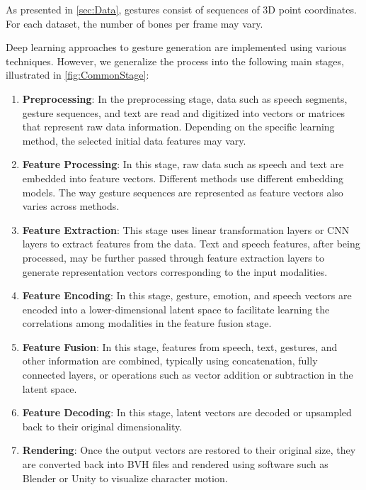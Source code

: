 As presented in \autoref{sec:Data}, gestures consist of sequences of 3D point coordinates. For each dataset, the number of bones per frame may vary.


Deep learning approaches to gesture generation are implemented using various techniques. However, we generalize the process into the following main stages, illustrated in \autoref{fig:CommonStage}:


\begin{enumerate}
	\item \textbf{Preprocessing}: In the preprocessing stage, data such as speech segments, gesture sequences, and text are read and digitized into vectors or matrices that represent raw data information. Depending on the specific learning method, the selected initial data features may vary.
	
	\item \textbf{Feature Processing}: In this stage, raw data such as speech and text are embedded into feature vectors. Different methods use different embedding models. The way gesture sequences are represented as feature vectors also varies across methods.
	
	\item \textbf{Feature Extraction}: This stage uses linear transformation layers or CNN layers to extract features from the data. Text and speech features, after being processed, may be further passed through feature extraction layers to generate representation vectors corresponding to the input modalities.
	
	\item \textbf{Feature Encoding}: In this stage, gesture, emotion, and speech vectors are encoded into a lower-dimensional latent space to facilitate learning the correlations among modalities in the feature fusion stage.
	
	\item \textbf{Feature Fusion}: In this stage, features from speech, text, gestures, and other information are combined, typically using concatenation, fully connected layers, or operations such as vector addition or subtraction in the latent space.
	
	\item \textbf{Feature Decoding}: In this stage, latent vectors are decoded or upsampled back to their original dimensionality.
	
	\item \textbf{Rendering}: Once the output vectors are restored to their original size, they are converted back into BVH files and rendered using software such as Blender or Unity to visualize character motion.
\end{enumerate}





